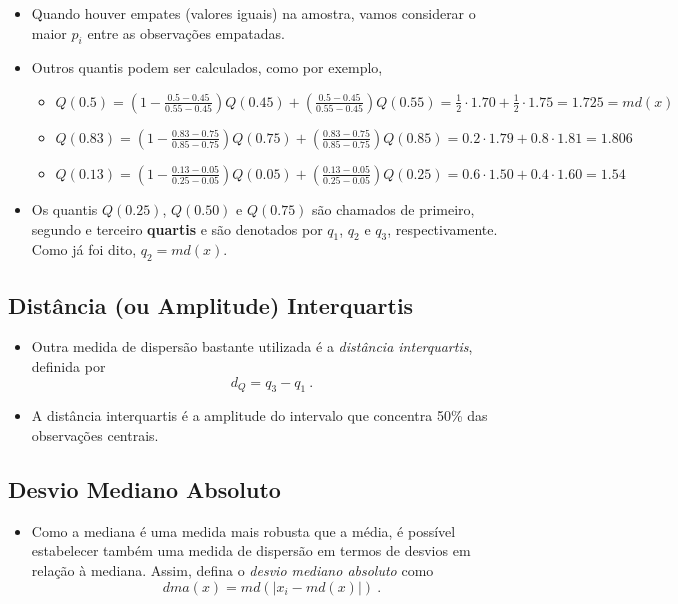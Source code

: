 \documentclass[
]{book}
\providecommand{\tightlist}{%
  \setlength{\itemsep}{0pt}\setlength{\parskip}{0pt}}
\begin{document}
\begin{itemize}
\item
  Quando houver empates (valores iguais) na amostra, vamos considerar o maior \(p_i\) entre as observações empatadas.
\item
  Outros quantis podem ser calculados, como por exemplo,

  \begin{itemize}
  \tightlist
  \item
    \(Q(0.5) = \left(1-\frac{0.5-0.45}{0.55-0.45}\right)Q(0.45)+\left(\frac{0.5-0.45}{0.55-0.45}\right)Q(0.55)=\frac{1}{2}\cdot 1.70 + \frac{1}{2}\cdot 1.75 = 1.725 = md(x)\)
  \item
    \(Q(0.83) = \left(1-\frac{0.83-0.75}{0.85-0.75}\right)Q(0.75)+\left(\frac{0.83-0.75}{0.85-0.75}\right)Q(0.85)=0.2\cdot 1.79 + 0.8\cdot 1.81 = 1.806\)
  \item
    \(Q(0.13) = \left(1-\frac{0.13-0.05}{0.25-0.05}\right)Q(0.05)+\left(\frac{0.13-0.05}{0.25-0.05}\right)Q(0.25)=0.6\cdot 1.50 + 0.4\cdot 1.60 = 1.54\)
  \end{itemize}
\item
  Os quantis \(Q(0.25)\), \(Q(0.50)\) e \(Q(0.75)\) são chamados de primeiro, segundo e terceiro \textbf{quartis} e são denotados por \(q_1\), \(q_2\) e \(q_3\), respectivamente. Como já foi dito, \(q_2 = md(x)\).
\end{itemize}

\subsection{Distância (ou Amplitude) Interquartis}\label{distuxe2ncia-ou-amplitude-interquartis}

\begin{itemize}
\tightlist
\item
  Outra medida de dispersão bastante utilizada é a \emph{distância interquartis}, definida por \[d_Q = q_3 - q_1~.\]
\item
  A distância interquartis é a amplitude do intervalo que concentra 50\% das observações centrais.
\end{itemize}

\subsection{Desvio Mediano Absoluto}\label{desvio-mediano-absoluto}

\begin{itemize}
\tightlist
\item
  Como a mediana é uma medida mais robusta que a média, é possível estabelecer também uma medida de dispersão em termos de desvios em relação à mediana. Assim, defina o \emph{desvio mediano absoluto} como \[dma(x) = md(|x_i - md(x)|)~.\]
\end{itemize}
\end{document}
